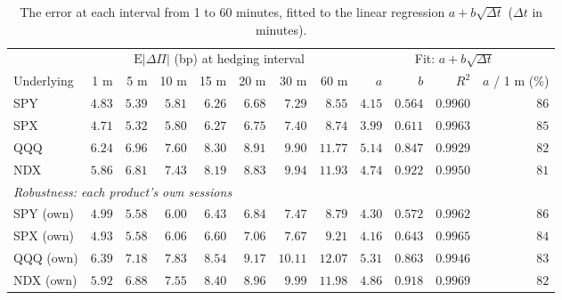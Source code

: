 \begin{table}[tbp]
\centering
\footnotesize
\setlength{\tabcolsep}{4pt}
\begin{tabular}{lrrrrrrrrrrr}
\toprule
 & \multicolumn{7}{c}{$\mathrm{E}|\Delta\Pi|$ (bp) at hedging interval} & \multicolumn{4}{c}{Fit: $a + b\sqrt{\Delta t}$} \\
\cmidrule(lr){2-8}\cmidrule(lr){9-12}
Underlying & 1 m & 5 m & 10 m & 15 m & 20 m & 30 m & 60 m & $a$ & $b$ & $R^2$ & $a$ / 1 m (\%) \\
\midrule
SPY & $4.83$ & $5.39$ & $5.81$ & $6.26$ & $6.68$ & $7.29$ & $8.55$ & $4.15$ & $0.564$ & $0.9960$ & $86$ \\
SPX & $4.71$ & $5.32$ & $5.80$ & $6.27$ & $6.75$ & $7.40$ & $8.74$ & $3.99$ & $0.611$ & $0.9963$ & $85$ \\
QQQ & $6.24$ & $6.96$ & $7.60$ & $8.30$ & $8.91$ & $9.90$ & $11.77$ & $5.14$ & $0.847$ & $0.9929$ & $82$ \\
NDX & $5.86$ & $6.81$ & $7.43$ & $8.19$ & $8.83$ & $9.94$ & $11.93$ & $4.74$ & $0.922$ & $0.9950$ & $81$ \\
\midrule
\multicolumn{12}{l}{\emph{Robustness: each product's own sessions}} \\
SPY (own) & $4.99$ & $5.58$ & $6.00$ & $6.43$ & $6.84$ & $7.47$ & $8.79$ & $4.30$ & $0.572$ & $0.9962$ & $86$ \\
SPX (own) & $4.93$ & $5.58$ & $6.06$ & $6.60$ & $7.06$ & $7.67$ & $9.21$ & $4.16$ & $0.643$ & $0.9965$ & $84$ \\
QQQ (own) & $6.39$ & $7.18$ & $7.83$ & $8.54$ & $9.17$ & $10.11$ & $12.07$ & $5.31$ & $0.863$ & $0.9946$ & $83$ \\
NDX (own) & $5.92$ & $6.88$ & $7.55$ & $8.40$ & $8.96$ & $9.99$ & $11.98$ & $4.86$ & $0.918$ & $0.9969$ & $82$ \\
\bottomrule
\end{tabular}
\caption{The error at each interval from 1 to 60 minutes, fitted to the linear regression $a + b\sqrt{\Delta t}$ ($\Delta t$ in minutes).}
\label{tab:floor4}
\end{table}
